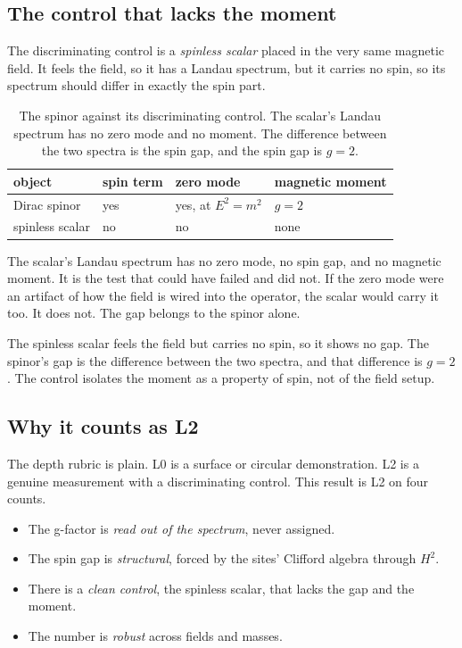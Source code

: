 \subsection{The control that lacks the moment}

The discriminating control is a \emph{spinless scalar} placed in the very same magnetic field. It feels the field, so it has a Landau spectrum, but it carries no spin, so its spectrum should differ in exactly the spin part.

\begin{table}[ht]
\centering
\begin{tabular}{@{}llll@{}}
\toprule
object & spin term & zero mode & magnetic moment \\
\midrule
Dirac spinor & yes & yes, at $E^2 = m^2$ & $g = 2$ \\
spinless scalar & no & no & none \\
\bottomrule
\end{tabular}
\caption{The spinor against its discriminating control. The scalar's Landau spectrum has no zero mode and no moment. The difference between the two spectra is the spin gap, and the spin gap is $g = 2$.}
\label{tab:g-control}
\end{table}

The scalar's Landau spectrum has no zero mode, no spin gap, and no magnetic moment. It is the test that could have failed and did not. If the zero mode were an artifact of how the field is wired into the operator, the scalar would carry it too. It does not. The gap belongs to the spinor alone.

\begin{principle}
The spinless scalar feels the field but carries no spin, so it shows no gap. The spinor's gap is the difference between the two spectra, and that difference is $g = 2$. The control isolates the moment as a property of spin, not of the field setup.
\end{principle}

\subsection{Why it counts as L2}

The depth rubric is plain. L0 is a surface or circular demonstration. L2 is a genuine measurement with a discriminating control. This result is L2 on four counts.

\begin{itemize}
\item The g-factor is \emph{read out of the spectrum}, never assigned.
\item The spin gap is \emph{structural}, forced by the sites' Clifford algebra through $H^2$.
\item There is a \emph{clean control}, the spinless scalar, that lacks the gap and the moment.
\item The number is \emph{robust} across fields and masses.
\end{itemize}


